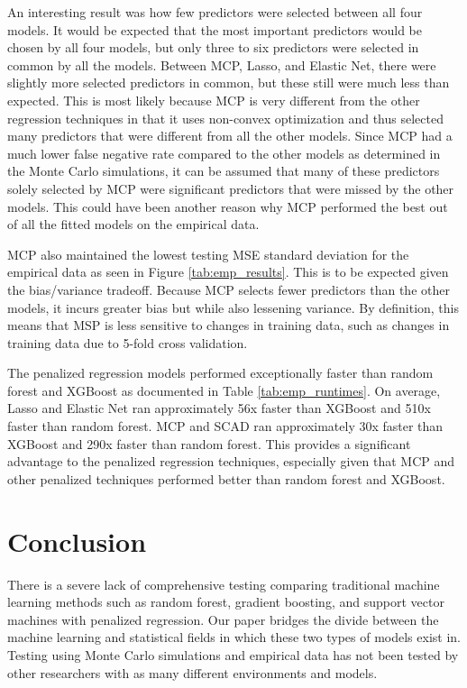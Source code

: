 \documentclass{article}
\begin{document}
An interesting result was how few predictors were selected between all four models. It would be expected that the most important predictors would be chosen by all four models, but only three to six predictors were selected in common by all the models. Between MCP, Lasso, and Elastic Net, there were slightly more selected predictors in common, but these still were much less than expected. This is most likely because MCP is very different from the other regression techniques in that it uses non-convex optimization and thus selected many predictors that were different from all the other models. Since MCP had a much lower false negative rate compared to the other models as determined in the Monte Carlo simulations, it can be assumed that many of these predictors solely selected by MCP were significant predictors that were missed by the other models. This could have been another reason why MCP performed the best out of all the fitted models on the empirical data. 

MCP also maintained the lowest testing MSE standard deviation for the empirical data as seen in Figure \ref{tab:emp_results}. This is to be expected given the bias/variance tradeoff. Because MCP selects fewer predictors than the other models, it incurs greater bias but while also lessening variance. By definition, this means that MSP is less sensitive to changes in training data, such as changes in training data due to 5-fold cross validation. 

The penalized regression models performed exceptionally faster than random forest and XGBoost as documented in Table \ref{tab:emp_runtimes}. On average, Lasso and Elastic Net ran approximately 56x faster than XGBoost and 510x faster than random forest. MCP and SCAD ran approximately 30x faster than XGBoost and 290x faster than random forest. This provides a significant advantage to the penalized regression techniques, especially given that MCP and other penalized techniques performed better than random forest and XGBoost. 


\section{Conclusion}

There is a severe lack of comprehensive testing comparing traditional machine learning methods such as random forest, gradient boosting, and support vector machines with penalized regression. Our paper bridges the divide between the machine learning and statistical fields in which these two types of models exist in. Testing using Monte Carlo simulations and empirical data has not been tested by other researchers with as many different environments and models.
\end{document}
